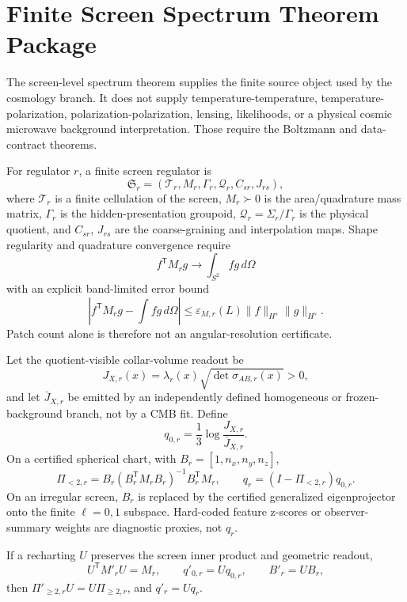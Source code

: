 \section{Finite Screen Spectrum Theorem Package}\label{sec:screen-spectrum-theorems}

The screen-level spectrum theorem supplies the finite source object used by
the cosmology branch. It does not supply temperature-temperature,
temperature-polarization, polarization-polarization, lensing, likelihoods, or
a physical cosmic microwave background interpretation. Those require the
Boltzmann and data-contract theorems.

\begin{definition}\label{def:oph-screen-regulator}
For regulator \(r\), a finite screen regulator is
\[
  \mathfrak S_r=(\mathcal T_r,M_r,\Gamma_r,\mathcal Q_r,C_{sr},J_{rs}),
\]
where \(\mathcal T_r\) is a finite cellulation of the screen, \(M_r\succ0\) is the
area/quadrature mass matrix, \(\Gamma_r\) is the hidden-presentation groupoid,
\(\mathcal Q_r=\Sigma_r/\Gamma_r\) is the physical quotient, and \(C_{sr}\), \(J_{rs}\) are the
coarse-graining and interpolation maps.  Shape regularity and quadrature convergence require
\[
  f^{\mathsf T}M_rg \to \int_{S^2}fg\,d\Omega
\]
with an explicit band-limited error bound
\[
  \left|f^{\mathsf T}M_rg-\int f g\,d\Omega\right|
  \le \varepsilon_{M,r}(L)\|f\|_{H^s}\|g\|_{H^s}.
\]
Patch count alone is therefore not an angular-resolution certificate.
\end{definition}

\begin{definition}\label{def:oph-screen-scalar}
Let the quotient-visible collar-volume readout be
\[
  J_{X,r}(x)=\lambda_r(x)\sqrt{\det\sigma_{AB,r}(x)}>0,
\]
and let \(\bar J_{X,r}\) be emitted by an independently defined homogeneous or frozen-background
branch, not by a CMB fit.  Define
\[
  q_{0,r}=\frac13\log\frac{J_{X,r}}{\bar J_{X,r}}.
\]
On a certified spherical chart, with \(B_r=[1,n_x,n_y,n_z]\),
\[
  \Pi_{<2,r}=B_r(B_r^{\mathsf T}M_rB_r)^{-1}B_r^{\mathsf T}M_r,\qquad
  q_r=(I-\Pi_{<2,r})q_{0,r}.
\]
On an irregular screen, \(B_r\) is replaced by the certified generalized eigenprojector onto the
finite \(\ell=0,1\) subspace.  Hard-coded feature z-scores or observer-summary weights are
diagnostic proxies, not \(q_r\).
\end{definition}

\begin{proposition}\label{prop:oph-screen-scalar-invariance}
If a recharting \(U\) preserves the screen inner product and geometric readout,
\[
  U^{\mathsf T}M'_rU=M_r,\qquad q'_{0,r}=Uq_{0,r},\qquad B'_r=UB_r,
\]
then \(\Pi'_{\ge2,r}U=U\Pi_{\ge2,r}\), and \(q'_r=Uq_r\).
\end{proposition}

